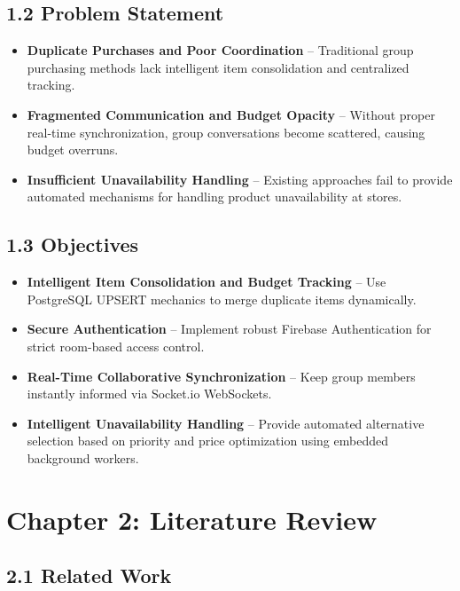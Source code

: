 \documentclass[a4paper,12pt]{article}
\begin{document}
\subsection*{1.2 Problem Statement}
\begin{itemize}
    \item \textbf{Duplicate Purchases and Poor Coordination} -- Traditional group purchasing methods lack intelligent item consolidation and centralized tracking.
    \item \textbf{Fragmented Communication and Budget Opacity} -- Without proper real-time synchronization, group conversations become scattered, causing budget overruns.
    \item \textbf{Insufficient Unavailability Handling} -- Existing approaches fail to provide automated mechanisms for handling product unavailability at stores.
\end{itemize}

\subsection*{1.3 Objectives}
\begin{itemize}
    \item \textbf{Intelligent Item Consolidation and Budget Tracking} -- Use PostgreSQL UPSERT mechanics to merge duplicate items dynamically.
    \item \textbf{Secure Authentication} -- Implement robust Firebase Authentication for strict room-based access control.
    \item \textbf{Real-Time Collaborative Synchronization} -- Keep group members instantly informed via Socket.io WebSockets.
    \item \textbf{Intelligent Unavailability Handling} -- Provide automated alternative selection based on priority and price optimization using embedded background workers.
\end{itemize}

\newpage
\section*{Chapter 2: Literature Review}

\subsection*{2.1 Related Work}
\end{document}
